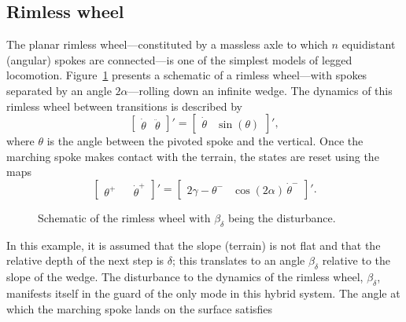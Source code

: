 \subsection{Rimless wheel}
The planar rimless wheel---constituted by a massless axle to which $n$ equidistant (angular) spokes are connected---is one of the simplest models of legged locomotion. Figure~\ref{fig:rw_schematic} presents a schematic of a rimless wheel---with spokes separated by an angle $2\alpha$---rolling down an infinite wedge. The dynamics of this rimless wheel between transitions is described by
$$
  \begin{bmatrix}
    \dot \theta& \ddot\theta
  \end{bmatrix}'=\begin{bmatrix}
    \dot\theta&\sin(\theta)
  \end{bmatrix}',
$$
where $\theta$ is the angle between the pivoted spoke and the vertical. Once the marching spoke makes contact with the terrain, the states are reset using the maps
$$
  \begin{bmatrix}
    \theta^+&&
    \dot \theta^+
  \end{bmatrix}'=\begin{bmatrix}
    2\gamma-\theta^-&
    \cos(2\alpha)\,\dot\theta^-
  \end{bmatrix}'.
$$
\begin{figure}[!t]
\centering
  \caption{Schematic of the rimless wheel with $\beta_\delta$ being the disturbance.}
  \label{fig:rw_schematic}
\end{figure}
In this example, it is assumed that the slope (terrain) is not flat and that the relative depth of the next step is $\delta$; this translates to an angle $\beta_\delta$ relative to the slope of the wedge. The disturbance to the dynamics of the rimless wheel, $\beta_\delta$, manifests itself in the guard of the only mode in this hybrid system. The angle at which the marching spoke lands on the surface satisfies
